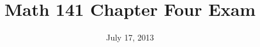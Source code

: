 \documentclass[fleqn,addpoints]{exam}
\title{Math 141 Chapter Four Exam}
\date{July 17, 2013}
\author{}
\begin{document}
  \maketitle  


  \begin{center}
  \gradetable[h][pages]
  \bonusgradetable[h][pages]
  \end{center}


\end{document}
